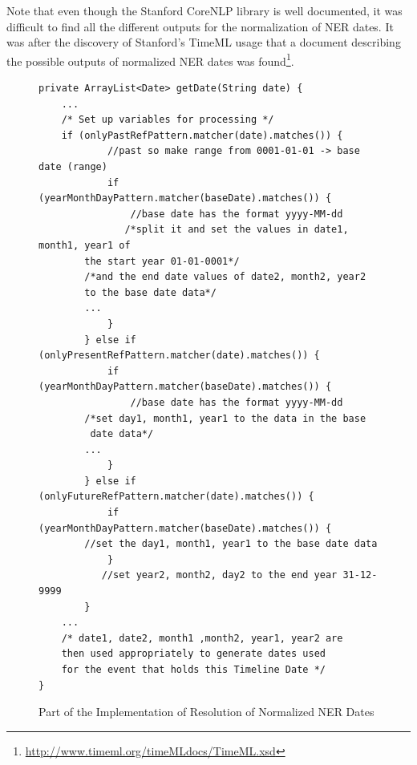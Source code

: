 \par Note that even though the Stanford CoreNLP library is well documented, it was difficult to find all the different outputs for the normalization of NER dates. It was after the discovery of Stanford's TimeML usage that a document describing the possible outputs of normalized NER dates was found\footnote{\url{http://www.timeml.org/timeMLdocs/TimeML.xsd}}. 

\begin{figure}[H]
\begin{lstlisting}
private ArrayList<Date> getDate(String date) {
	...
	/* Set up variables for processing */
	if (onlyPastRefPattern.matcher(date).matches()) {
            //past so make range from 0001-01-01 -> base date (range)
            if (yearMonthDayPattern.matcher(baseDate).matches()) {
                //base date has the format yyyy-MM-dd
               /*split it and set the values in date1, month1, year1 of 
		the start year 01-01-0001*/
		/*and the end date values of date2, month2, year2 
		to the base date data*/
		...
            }
        } else if (onlyPresentRefPattern.matcher(date).matches()) {
            if (yearMonthDayPattern.matcher(baseDate).matches()) {
                //base date has the format yyyy-MM-dd
		/*set day1, month1, year1 to the data in the base
		 date data*/
		...
            }
        } else if (onlyFutureRefPattern.matcher(date).matches()) {
            if (yearMonthDayPattern.matcher(baseDate).matches()) {
		//set the day1, month1, year1 to the base date data
            }
           //set year2, month2, day2 to the end year 31-12-9999
        }
	...
	/* date1, date2, month1 ,month2, year1, year2 are 
	then used appropriately to generate dates used 
	for the event that holds this Timeline Date */
}
\end{lstlisting}
\caption{Part of the Implementation of Resolution of Normalized NER Dates}
\label{fig:refCode}
\end{figure}


